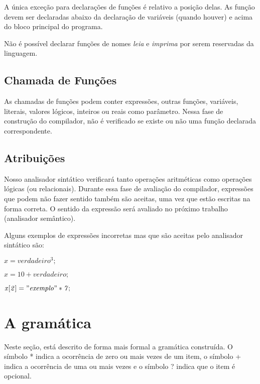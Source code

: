 \documentclass[
12pt,				%
a4paper,			%
english,			%
french,				%
spanish,			%
brazil,				%
article
]{abntex2}
\begin{document}
A única exceção para declarações de funções é relativo a posição delas. As função devem ser declaradas abaixo da declaração de variáveis (quando houver) e acima do bloco principal do programa.

Não é possível declarar funções de nomes \textit{leia} e \textit{imprima} por serem reservadas da linguagem.

\subsection{Chamada de Funções}
As chamadas de funções podem conter expressões, outras funções, variáveis, literais, valores lógicos, inteiros ou reais como parâmetro. Nessa fase de construção do compilador, não é verificado se existe ou não uma função declarada correspondente.

\subsection{Atribuições}
Nosso analisador sintático verificará tanto operações aritméticas como operações lógicas (ou relacionais). Durante essa fase de avaliação do compilador, expressões que podem não fazer sentido também são aceitas, uma vez que estão escritas na forma correta. O sentido da expressão será avaliado no próximo trabalho (analisador semântico).

Alguns exemplos de expressões incorretas mas que são aceitas pelo analisador sintático são:


\begin{math}
	\mathit{x = verdadeiro ^ 3;}
\end{math}

\begin{math}
	\mathit{x = 10 + verdadeiro;}
\end{math}

\begin{math}
	\mathit{x[2] = "exemplo" * 7;}
\end{math}


\section{A gramática}
Neste seção, está descrito de forma mais formal a gramática construída. O símbolo * indica a ocorrência de zero ou mais vezes de um item, o símbolo + indica a ocorrência de uma ou mais vezes e o símbolo ? indica que o item é opcional.
\end{document}

